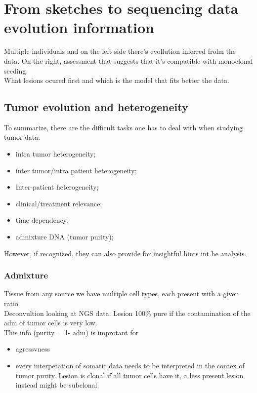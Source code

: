 \section{From sketches to sequencing data evolution information}
Multiple individuals and on the left side there's evollution inferred frolm the data. On the right, assessment that suggests that it's compatible with monoclonal seeding. \\
What lesions ocured first and which is the model that fits better the data.\\

\subsection{Tumor evolution and heterogeneity}
To summarize, there are the difficult tasks one has to deal with when studying tumor data:
\begin{itemize}
\item intra tumor heterogeneity;
\item inter tumor/intra patient heterogeneity;
\item Inter-patient heterogeneity;
\item clinical/treatment relevance;
\item time dependency;
\item admixture DNA (tumor purity);
\end{itemize}

However, if recognized, they can also provide for insightful hints int he analysis.\\

\subsubsection{Admixture}
Tissue from any source we have multiple cell types, each present with a given ratio.\\
Deconvultion looking at NGS data. Lesion 100\% pure if the contamination of the adm of tumor cells is very low. \\
This info (purity = 1- adm) is improtant for 
\begin{itemize}
\item agressvness
\item every interpetation of somatic data needs to be interpreted in the contex of tumor purity. Lesion is clonal if all tumor cells have it, a less present lesion instead might be subclonal.
\end{itemize}

